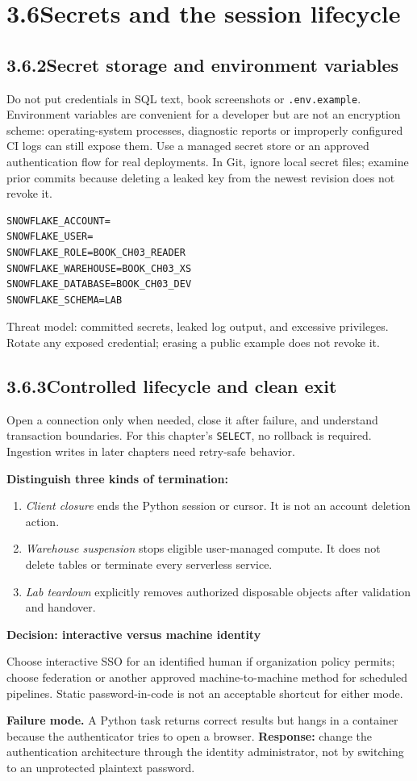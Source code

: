 \documentclass[11pt,twoside]{article}
\newcommand{\topic}[2]{\subsection*{#1\quad #2}}
\begin{document}
\newpage
\section*{3.6\quad Secrets and the session lifecycle}
\topic{3.6.2}{Secret storage and environment variables}
Do not put credentials in SQL text, book screenshots or \texttt{.env.example}. Environment variables are convenient for a developer but are not an encryption scheme: operating-system processes, diagnostic reports or improperly configured CI logs can still expose them. Use a managed secret store or an approved authentication flow for real deployments. In Git, ignore local secret files; examine prior commits because deleting a leaked key from the newest revision does not revoke it.

\begin{lstlisting}[caption={Committable .env.example: values deliberately left blank.}]
SNOWFLAKE_ACCOUNT=
SNOWFLAKE_USER=
SNOWFLAKE_ROLE=BOOK_CH03_READER
SNOWFLAKE_WAREHOUSE=BOOK_CH03_XS
SNOWFLAKE_DATABASE=BOOK_CH03_DEV
SNOWFLAKE_SCHEMA=LAB
\end{lstlisting}
Threat model: committed secrets, leaked log output, and excessive privileges. Rotate any exposed credential; erasing a public example does not revoke it.

\topic{3.6.3}{Controlled lifecycle and clean exit}
Open a connection only when needed, close it after failure, and understand transaction boundaries. For this chapter's \texttt{SELECT}, no rollback is required. Ingestion writes in later chapters need retry-safe behavior.

\textbf{Distinguish three kinds of termination:}
\begin{enumerate}
\item \emph{Client closure} ends the Python session or cursor. It is not an account deletion action.
\item \emph{Warehouse suspension} stops eligible user-managed compute. It does not delete tables or terminate every serverless service.
\item \emph{Lab teardown} explicitly removes authorized disposable objects after validation and handover.
\end{enumerate}
\begin{insight}
\textbf{Decision: interactive versus machine identity}\par
Choose interactive SSO for an identified human if organization policy permits; choose federation or another approved machine-to-machine method for scheduled pipelines. Static password-in-code is not an acceptable shortcut for either mode.
\end{insight}
\textbf{Failure mode.} A Python task returns correct results but hangs in a container because the authenticator tries to open a browser. \textbf{Response:} change the authentication architecture through the identity administrator, not by switching to an unprotected plaintext password.
\end{document}
